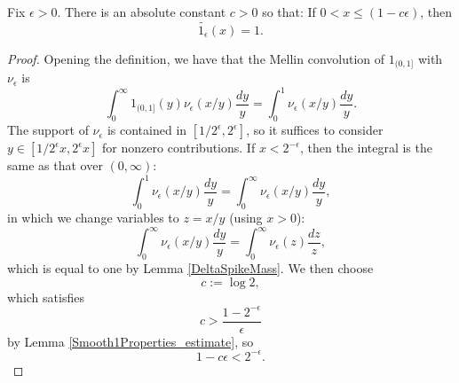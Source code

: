 \begin{lemma}
\label{Smooth1Properties_below}
\leanok
Fix $\epsilon>0$. There is an absolute constant $c>0$ so that:
  If $0 < x \leq (1-c\epsilon)$, then
  $$\widetilde{1_{\epsilon}}(x) = 1.$$
\end{lemma}
\begin{proof}
\leanok
Opening the definition, we have that the Mellin convolution of $1_{(0,1]}$ with $\nu_\epsilon$ is
  $$
  \int_0^\infty 1_{(0,1]}(y)\nu_\epsilon(x/y)\frac{dy}{y}
  =
  \int_0^1 \nu_\epsilon(x/y)\frac{dy}{y}.
  $$
  The support of $\nu_\epsilon$ is contained in $[1/2^\epsilon,2^\epsilon]$, so it suffices to
  consider $y \in [1/2^\epsilon x,2^\epsilon x]$ for nonzero contributions. If $x < 2^{-\epsilon}$,
  then the integral is the same as that over $(0,\infty)$:
  $$
  \int_0^1 \nu_\epsilon(x/y)\frac{dy}{y}
  =
  \int_0^\infty \nu_\epsilon(x/y)\frac{dy}{y},
  $$
  in which we change variables to $z=x/y$ (using $x>0$):
  $$
  \int_0^\infty \nu_\epsilon(x/y)\frac{dy}{y}
  =
  \int_0^\infty \nu_\epsilon(z)\frac{dz}{z},
  $$
  which is equal to one by Lemma \ref{DeltaSpikeMass}.
  We then choose
  $$
    c:=\log 2,
  $$
  which satisfies
  $$
    c > \frac{1-2^{-\epsilon}}\epsilon
  $$
  by Lemma \ref{Smooth1Properties_estimate}, so
  $$
    1-c\epsilon < 2^{-\epsilon}.
  $$
\end{proof}

